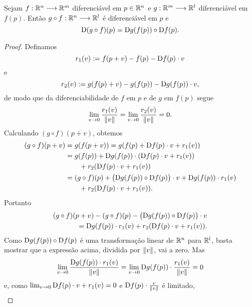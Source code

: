 \begin{prop}
Sejam $f: \mathbb{R}^n \longrightarrow \mathbb{R}^m$ diferenciável em $p \in \mathbb{R}^n$ e $g: \mathbb{R}^m \longrightarrow \mathbb{R}^l$ diferenciável em $f(p)$. Então $g \circ f: \mathbb{R}^n \longrightarrow \mathbb{R}^l$ é diferenciável em $p$ e
	\begin{equation*}
	\mathrm{D} (g \circ f)(p) = \mathrm{D} g(f(p)) \circ \mathrm{D} f(p).
	\end{equation*}
\end{prop}
\begin{proof} Definamos
	\begin{equation*}
	r_1(v) := f(p+v) - f(p) - \mathrm{D} f(p) \cdot v
	\end{equation*}
e
	\begin{equation*}
	r_2(v) := g(f(p)+v) - g(f(p)) - \mathrm{D} g(f(p)) \cdot v,
	\end{equation*}
de modo que da diferenciabilidade de $f$ em $p$ e de $g$ em $f(p)$ segue
	\begin{equation*}
	\lim_{v \rightarrow 0} \frac{r_1(v)}{\left\Vert{v}\right\Vert} = \lim_{v \rightarrow 0} \frac{r_2(v)}{\left\Vert{v}\right\Vert} = 0.
	\end{equation*}	
Calculando $(g \circ f)(p+v)$, obtemos
	\begin{align*}
	(g \circ f)(p+v) &= g(f(p+v)) = g(f(p)+\mathrm{D} f(p) \cdot v + r_1(v)) \\
		&= g(f(p)) + \mathrm{D} g(f(p)) \cdot (\mathrm{D} f(p) \cdot v + r_1(v)) \\
		&\qquad + r_2(\mathrm{D} f(p) \cdot v + r_1(v)) \\
		&= (g \circ f)(p) + \big(\mathrm{D} g(f(p)) \circ \mathrm{D} f(p)\big) \cdot v + \mathrm{D} g(f(p)) \cdot r_1(v) \\
		&\qquad + r_2(\mathrm{D} f(p) \cdot v + r_1(v)).
	\end{align*}
Portanto
	\begin{align*}
	(g \circ f)(p+v) - (g \circ f)(p) - \big(\mathrm{D} g(f(p)) \circ \mathrm{D} f(p)\big) \cdot v \\
	\qquad = \mathrm{D} g(f(p)) \cdot r_1(v) + r_2(\mathrm{D} f(p) \cdot v + r_1(v)).
	\end{align*}
Como $\mathrm{D} g(f(p)) \circ \mathrm{D} f(p)$ é uma transformação linear de $\mathbb{R}^n$ para $\mathbb{R}^l$, basta mostrar que a expressão acima, dividida por $\left\Vert{v}\right\Vert$, vai a zero. Mas
	\begin{equation*}
	\lim_{v \rightarrow 0} \frac{\mathrm{D} g(f(p)) \cdot r_1(v)}{\left\Vert{v}\right\Vert} = \lim_{v \rightarrow 0} \mathrm{D} g(f(p)) \cdot \frac{r_1(v)}{\left\Vert{v}\right\Vert} = 0
	\end{equation*}
e, como $\lim_{v \rightarrow 0} \mathrm{D} f(p) \cdot v + r_1(v) = 0$ e $\mathrm{D} f(p) \cdot \frac{v}{\left\Vert{v}\right\Vert}$ é limitado,
	\begin{align*}

\end{align*}
\end{proof}
